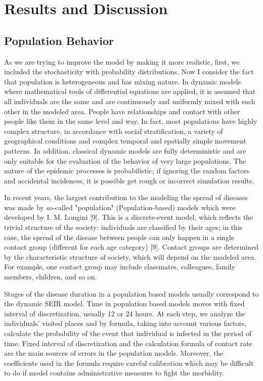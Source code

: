 \chapter{Results and Discussion}
\section{Population Behavior}

As we are trying to improve the model by making it more realistic, first, we included the stochasticity with probability distributions. Now I consider the fact that population is heterogeneous and has mixing nature. In dynamic models where mathematical tools of differential equations are applied, it is assumed that all individuals are the same and are continuously and uniformly mixed with each other in the modeled area. People have relationships and contact with other people like them in the same level and way. In fact, most populations have highly complex structure, in accordance with social stratification, a variety of geographical conditions and complex temporal and spatially simple movement patterns. In addition, classical dynamic models are fully deterministic and are only suitable for the evaluation of the behavior of very large populations. The nature of the epidemic processes is probabilistic; if ignoring the random factors and accidental incidences, it is possible get rough or incorrect simulation results.

In recent years, the largest contribution to the modeling the spread of diseases was made by so-called "population" (Population-based) models which were developed by I. M. Longini [9]. This is a discrete-event model, which reflects the trivial structure of the society: individuals are classified by their ages; in this case, the spread of the disease between people can only happen in a single contact group (different for each age category) [9]. Contact groups are determined by the characteristic structure of society, which will depend on the modeled area. For example, one contact group may include classmates, colleagues, family members, children, and so on.

Stages of the disease duration in a population based models usually correspond to the dynamic SEIR model. Time in population based models moves with fixed interval of discretization, usually 12 or 24 hours. At each step, we analyze the individuals’ visited places and by formula, taking into account various factors, calculate the probability of the event that individual is infected in the period of time.  Fixed interval of discretization and the calculation formula of contact rate are the main sources of errors in the population models. Moreover, the coefficients used in the formula require careful calibration which may be difficult to do if model contains administrative measures to fight the morbidity.

